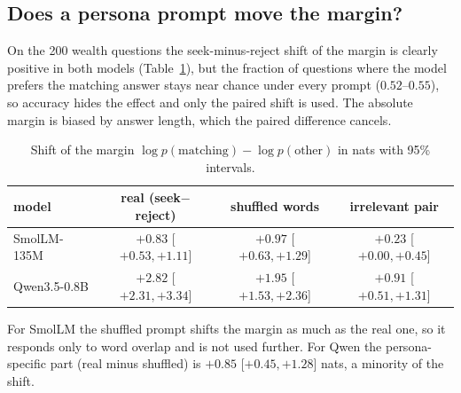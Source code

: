 \documentclass[11pt]{article}
\begin{document}
\subsection{Does a persona prompt move the margin?}
On the 200 wealth questions the seek-minus-reject shift of the margin is clearly positive in both models (Table~\ref{tab:gate}), but the fraction of questions where the model prefers the matching answer stays near chance under every prompt
($0.52$--$0.55$), so accuracy hides the effect and only the paired shift is used. The absolute margin is biased by answer length, which the paired difference cancels.
\begin{table}[h]
\centering\small
\begin{tabular}{lccc}
\toprule
model & real (seek$-$reject) & shuffled words & irrelevant pair\\
\midrule
SmolLM-135M & $+0.83$ [$+0.53,+1.11$] & $+0.97$ [$+0.63,+1.29$] & $+0.23$ [$+0.00,+0.45$]\\
Qwen3.5-0.8B & $+2.82$ [$+2.31,+3.34$] & $+1.95$ [$+1.53,+2.36$] & $+0.91$ [$+0.51,+1.31$]\\
\bottomrule
\end{tabular}
\caption{Shift of the margin $\log p(\text{matching})-\log p(\text{other})$ in nats with 95\% intervals.}
\label{tab:gate}
\end{table}
For SmolLM the shuffled prompt shifts the margin as much as the real one, so it responds only to word overlap and is not used further.
For Qwen the persona-specific part (real minus shuffled) is $+0.85$ [$+0.45,+1.28$] nats, a minority of the shift.
\end{document}
